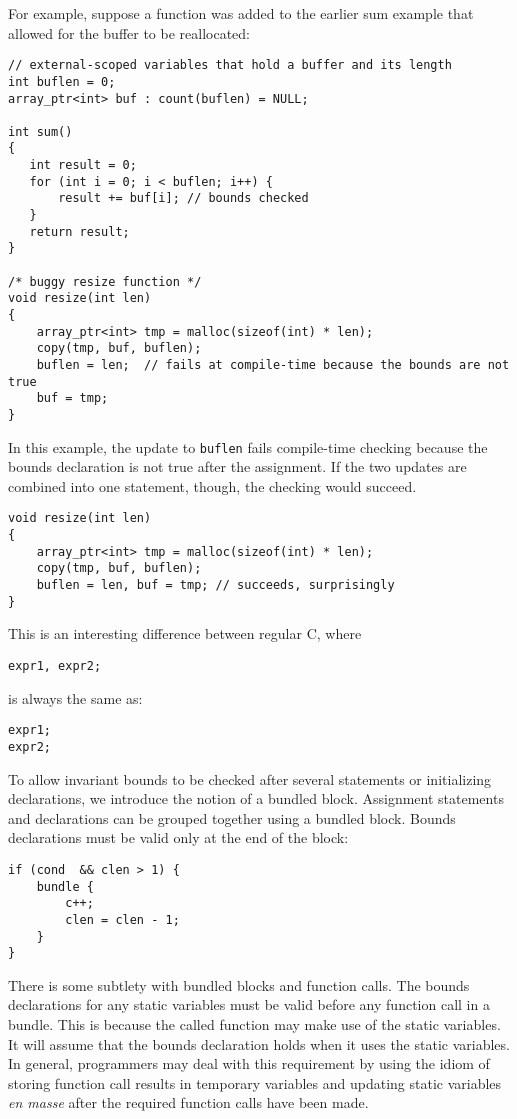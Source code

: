 For example, suppose a function was added to the earlier sum example
that allowed for the buffer to be reallocated:
\begin{verbatim}
// external-scoped variables that hold a buffer and its length
int buflen = 0;
array_ptr<int> buf : count(buflen) = NULL;

int sum()
{
   int result = 0;
   for (int i = 0; i < buflen; i++) {
       result += buf[i]; // bounds checked
   }
   return result;
}

/* buggy resize function */
void resize(int len) 
{
    array_ptr<int> tmp = malloc(sizeof(int) * len);
    copy(tmp, buf, buflen);
    buflen = len;  // fails at compile-time because the bounds are not true
    buf = tmp;
}
\end{verbatim}
In this example, the update to \texttt{buflen} fails compile-time
checking because the bounds declaration is not true after the
assignment. If the two updates are combined into one statement, though,
the checking would succeed.

\begin{verbatim}
void resize(int len) 
{
    array_ptr<int> tmp = malloc(sizeof(int) * len);
    copy(tmp, buf, buflen);
    buflen = len, buf = tmp; // succeeds, surprisingly
}
\end{verbatim}

This is an interesting difference between regular C, where

\begin{verbatim}
expr1, expr2;
\end{verbatim}

is always the same as:

\begin{verbatim}
expr1;
expr2;
\end{verbatim}

To allow invariant bounds to be checked after several statements or
initializing declarations, we introduce the notion of a bundled block.
Assignment statements and declarations can be grouped together using a
bundled block. Bounds declarations must be valid only at the end of the
block:

\begin{verbatim}
if (cond  && clen > 1) {
    bundle {
        c++;
        clen = clen - 1;
    }
}
\end{verbatim}

There is some subtlety with bundled blocks and function calls. The
bounds declarations for any static variables must be valid before any
function call in a bundle. This is because the called function may make
use of the static variables. It will assume that the bounds declaration
holds when it uses the static variables. In general, programmers may
deal with this requirement by using the idiom of storing function call
results in temporary variables and updating static variables \textit{en
masse} after the required function calls have been made.

